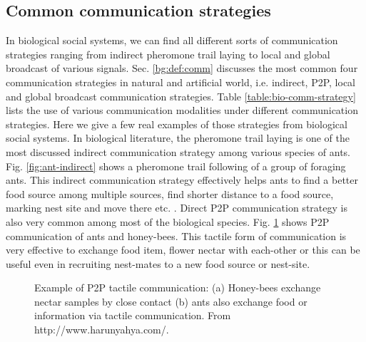 \documentclass{intech}
\begin{document}
\subsection{Common communication strategies}
\label{bg:bio-comm:strategies}
In biological social systems, we can find all different sorts of communication strategies ranging from indirect pheromone trail laying to local and global broadcast of various signals. Sec. \ref{bg:def:comm} discusses the most common four communication strategies in natural and artificial world, i.e. indirect, P2P, local and global broadcast communication strategies. Table \ref{table:bio-comm-strategy} lists the use of various communication modalities under different communication strategies. Here we give a few real examples of those strategies from biological social systems. In biological literature, the pheromone trail laying is one of the most discussed indirect communication strategy among various species of ants. Fig. \ref{fig:ant-indirect} shows a pheromone trail following of a group of foraging ants. This indirect communication strategy effectively helps ants to find a better food source among multiple sources, find shorter distance to a food source, marking nest site and move there etc. \citep{Hughes2008}. Direct P2P communication strategy is also very common among most of the biological species. Fig. \ref{fig:bees-ants-p2p-comm} shows P2P communication of ants and honey-bees. This tactile form of communication is very effective to exchange food item, flower nectar with each-other or this can be useful even in recruiting nest-mates to a new food source or nest-site.
\begin{figure}
\centering
{}
\caption{Example of P2P tactile communication: (a) Honey-bees exchange nectar samples by close contact (b) ants also exchange food or information via tactile communication. \protect\newline  From http://www.harunyahya.com/.} %
\label{fig:bees-ants-p2p-comm}
\end{figure}
\end{document}
